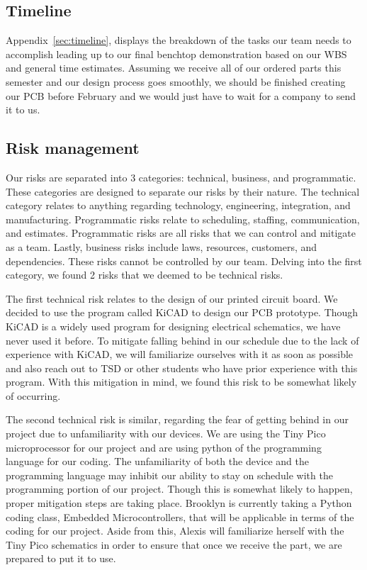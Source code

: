 \documentclass[twocolumn,10pt]{IEEEtran}
\begin{document}
\subsection{Timeline}
Appendix~\ref{sec:timeline},  displays the breakdown of the tasks our team needs to accomplish leading up to our final benchtop demonstration based on our WBS and general time estimates. Assuming we receive all of our ordered parts this semester and our design process goes smoothly, we should be finished creating our PCB before February and we would just have to wait for a company to send it to us.

\subsection{Risk management}
Our risks are separated into 3 categories: technical, business, and programmatic. These categories are designed to separate our risks by their nature. The technical category relates to anything regarding technology, engineering, integration, and manufacturing. Programmatic risks relate to scheduling, staffing, communication, and estimates. Programmatic risks are all risks that we can control and mitigate as a team. Lastly, business risks include laws, resources, customers, and dependencies. These risks cannot be controlled by our team. Delving into the first category, we found 2 risks that we deemed to be technical risks. 

The first technical risk relates to the design of our printed circuit board. We decided to use the program called KiCAD to design our PCB prototype. Though KiCAD is a widely used program for designing electrical schematics, we have never used it before. To mitigate falling behind in our schedule due to the lack of experience with KiCAD, we will familiarize ourselves with it as soon as possible and also reach out to TSD or other students who have prior experience with this program. With this mitigation in mind, we found this risk to be somewhat likely of occurring. 

The second technical risk is similar, regarding the fear of getting behind in our project due to unfamiliarity with our devices. We are using the Tiny Pico microprocessor for our project and are using python of the programming language for our coding. The unfamiliarity of both the device and the programming language may inhibit our ability to stay on schedule with the programming portion of our project. Though this is somewhat likely to happen, proper mitigation steps are taking place. Brooklyn is currently taking a Python coding class, Embedded Microcontrollers, that will be applicable in terms of the coding for our project. Aside from this, Alexis will familiarize herself with the Tiny Pico schematics in order to ensure that once we receive the part, we are prepared to put it to use. 
\end{document}
